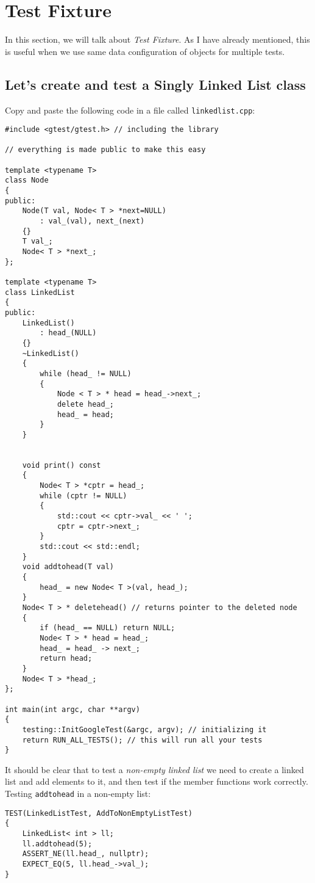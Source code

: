 \section{Test Fixture}

In this section, we will talk about \emph{Test Fixture}. As I have already
mentioned, this is useful when we use same data configuration of objects for
multiple tests.

\subsection{Let's create and test a Singly Linked List class}
Copy and paste the following code in a file called \verb!linkedlist.cpp!:
\begin{Verbatim}[frame=single]
#include <gtest/gtest.h> // including the library

// everything is made public to make this easy

template <typename T>
class Node      
{
public:
    Node(T val, Node< T > *next=NULL)
        : val_(val), next_(next)
    {}
    T val_;
    Node< T > *next_;
};

template <typename T>
class LinkedList
{
public:
    LinkedList()
        : head_(NULL)
    {}
    ~LinkedList()
    {
        while (head_ != NULL)
        {
            Node < T > * head = head_->next_;
            delete head_;
            head_ = head;
        }
    }


    void print() const
    {
        Node< T > *cptr = head_;
        while (cptr != NULL)
        {
            std::cout << cptr->val_ << ' ';
            cptr = cptr->next_;
        }
        std::cout << std::endl;
    }
    void addtohead(T val)
    {
        head_ = new Node< T >(val, head_);
    }
    Node< T > * deletehead() // returns pointer to the deleted node
    {
        if (head_ == NULL) return NULL;
        Node< T > * head = head_;
        head_ = head_ -> next_;
        return head;
    }
    Node< T > *head_;
};

int main(int argc, char **argv)
{
    testing::InitGoogleTest(&argc, argv); // initializing it
    return RUN_ALL_TESTS(); // this will run all your tests
}
\end{Verbatim}

It should be clear that to test a \emph{non-empty linked list} we need to create a linked list and add elements to it, and then test if the member functions work correctly. \\
Testing \verb!addtohead! in a non-empty list:
\begin{Verbatim}[frame=single]
TEST(LinkedListTest, AddToNonEmptyListTest)
{
    LinkedList< int > ll;
    ll.addtohead(5);
    ASSERT_NE(ll.head_, nullptr);
    EXPECT_EQ(5, ll.head_->val_);
}
\end{Verbatim}


